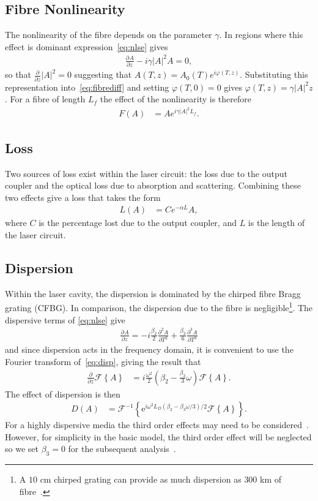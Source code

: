 \documentclass[12pt]{article}
\newcommand{\pdiff}[3][]{\frac{\partial^{#1}#2}{\partial{#3}^{#1}}}
\newcommand{\FT}[1]{\mathcal{F}\left\{ #1 \right\}}
\newcommand{\FTi}[1]{\mathcal{F}^{-1}\left\{ #1 \right\}}
\begin{document}
\subsection{Fibre Nonlinearity}
The nonlinearity of the fibre depends on the parameter $\gamma$. In regions where this effect is dominant expression~\eqref{eq:nlse} gives
\begin{align}
\label{eq:fibrediff}
	\pdiff{A}{z} - i \gamma |A|^2 A = 0,
\end{align}
so that $\frac{\partial}{\partial z} |A|^2 = 0$ suggesting that $A(T,z) = A_0(T) e^{i \varphi(T,z)}$. Substituting this representation into~\eqref{eq:fibrediff} and setting $\varphi(T,0)=0$ gives $\varphi(T,z) = \gamma |A|^2 z$. For a fibre of length $L_f$ the effect of the nonlinearity is therefore
\begin{align}
\label{eq:fibre}
	F(A) &= A e^{i \gamma |A|^2 L_f}.
\end{align}

\subsection{Loss}
Two sources of loss exist within the laser circuit: the loss due to the output coupler and the optical loss due to absorption and scattering. Combining these two effects give a loss that takes the form
\begin{align}
\label{eq:fibreloss}
	L(A) &= C e^{- \alpha L}A,
\end{align}
where $C$ is the percentage lost due to the output coupler, and $L$ is the length of the laser circuit.

\subsection{Dispersion}
Within the laser cavity, the dispersion is dominated by the chirped fibre Bragg grating (CFBG). In comparison, the dispersion due to the fibre is negligible\footnote{A $10$ cm chirped grating can provide as much dispersion as $300$ km of fibre~\cite{agrawal2002}.}. The dispersive terms of \eqref{eq:nlse} give
\begin{align}
\label{eq:disp}
	\pdiff{A}{z} = -i \frac{\beta_2}{2} \pdiff[2]{A}{T} + \frac{\beta_3}{6} \pdiff[3]{A}{T}
\end{align}
and since dispersion acts in the frequency domain, it is convenient to use the Fourier transform of~\eqref{eq:disp}, giving the result that
\begin{align*}
	\pdiff{}{z}\FT{A} &= i\frac{\omega^2}{2}\left(\beta_2 - \frac{\beta_3}{3} \omega\right) \FT{A}.
\end{align*}
The effect of dispersion is then
\begin{align}
\label{eq:dispersion}
	D(A) &= \FTi{\textrm{e}^{i \omega^2 L_D(\beta_2 - \beta_3 \omega/3)/2} \FT{A}}.
\end{align}
For a highly dispersive media the third order effects may need to be considered~\cite{agrawal2013, litchinitser}. However, for simplicity in the basic model, the third order effect will be neglected so we set $\beta_3=0$ for the subsequent analysis~\cite{agrawal2013, ferreira}.
\end{document}
